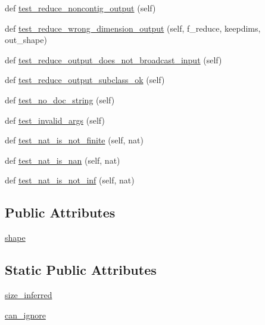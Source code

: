 \begin{DoxyCompactItemize}
\item 
def \hyperlink{classnumpy_1_1core_1_1tests_1_1test__ufunc_1_1TestUfunc_aeb11296ab8945b4f4b06b552cbbda53c}{test\+\_\+reduce\+\_\+noncontig\+\_\+output} (self)
\item 
def \hyperlink{classnumpy_1_1core_1_1tests_1_1test__ufunc_1_1TestUfunc_abfb945845f10b0b06c3620dc0dc8ee7f}{test\+\_\+reduce\+\_\+wrong\+\_\+dimension\+\_\+output} (self, f\+\_\+reduce, keepdims, out\+\_\+shape)
\item 
def \hyperlink{classnumpy_1_1core_1_1tests_1_1test__ufunc_1_1TestUfunc_a5d66114c9034cd99d5e4c8c96672035b}{test\+\_\+reduce\+\_\+output\+\_\+does\+\_\+not\+\_\+broadcast\+\_\+input} (self)
\item 
def \hyperlink{classnumpy_1_1core_1_1tests_1_1test__ufunc_1_1TestUfunc_acce99eaa03f719c4ca1fd540a89f5a85}{test\+\_\+reduce\+\_\+output\+\_\+subclass\+\_\+ok} (self)
\item 
def \hyperlink{classnumpy_1_1core_1_1tests_1_1test__ufunc_1_1TestUfunc_ad2f8ff632844be49b2e91f763d2634ee}{test\+\_\+no\+\_\+doc\+\_\+string} (self)
\item 
def \hyperlink{classnumpy_1_1core_1_1tests_1_1test__ufunc_1_1TestUfunc_a0e3e3da185085e5ff10fded16aa1a7bc}{test\+\_\+invalid\+\_\+args} (self)
\item 
def \hyperlink{classnumpy_1_1core_1_1tests_1_1test__ufunc_1_1TestUfunc_a1b69b8761fcef208accff0a53fa147bb}{test\+\_\+nat\+\_\+is\+\_\+not\+\_\+finite} (self, nat)
\item 
def \hyperlink{classnumpy_1_1core_1_1tests_1_1test__ufunc_1_1TestUfunc_ab64287f5d87df0554d78acaa48029aa2}{test\+\_\+nat\+\_\+is\+\_\+nan} (self, nat)
\item 
def \hyperlink{classnumpy_1_1core_1_1tests_1_1test__ufunc_1_1TestUfunc_ab940d760ce7f6c7773c151ad7952f1e0}{test\+\_\+nat\+\_\+is\+\_\+not\+\_\+inf} (self, nat)
\end{DoxyCompactItemize}
\subsection*{Public Attributes}
\begin{DoxyCompactItemize}
\item 
\hyperlink{classnumpy_1_1core_1_1tests_1_1test__ufunc_1_1TestUfunc_ab35544dd5e4c6acea18fd9e94269a737}{shape}
\end{DoxyCompactItemize}
\subsection*{Static Public Attributes}
\begin{DoxyCompactItemize}
\item 
\hyperlink{classnumpy_1_1core_1_1tests_1_1test__ufunc_1_1TestUfunc_ac8985eefa4aef33d6af2bea9d15872ac}{size\+\_\+inferred}
\item 
\hyperlink{classnumpy_1_1core_1_1tests_1_1test__ufunc_1_1TestUfunc_a0c2fbab02721dccd568b08fbdefe0d9b}{can\+\_\+ignore}
\end{DoxyCompactItemize}


